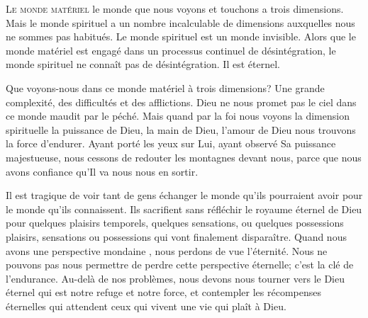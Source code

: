


\lettrine{L}{e monde matériel}
 \ocadr le monde que nous voyons et touchons \fcadr{} a trois dimensions.
 Mais le monde spirituel a un nombre incalculable de dimensions auxquelles
 nous ne sommes pas habitués. Le monde spirituel est un monde invisible.
 Alors que le monde matériel est engagé dans un processus
 continuel de désintégration, le monde spirituel ne connaît pas
 de désintégration. Il est éternel.


Que voyons-nous dans ce monde matériel à trois dimensions?
 Une grande complexité, des difficultés et des afflictions.
 Dieu ne nous promet pas le ciel dans ce monde maudit par le péché.
 Mais quand par la foi nous voyons la dimension spirituelle
 \ocadr la puissance de Dieu, la main de Dieu, l'amour de Dieu \fcadr{}
 nous trouvons la force d'endurer. Ayant porté les yeux sur Lui,
 ayant observé Sa puissance majestueuse, nous cessons de redouter
 les montagnes devant nous, parce que nous avons confiance
 qu'Il va nous nous en sortir.

Il est tragique de voir tant de gens échanger le monde
 qu'ils pourraient 
 avoir pour le monde qu'ils connaissent.
 Ils sacrifient sans réfléchir le royaume éternel de Dieu
 pour quelques plaisirs temporels, quelques sensations, ou quelques possessions
 \ocadr plaisirs, sensations ou possessions qui vont finalement disparaître.
 Quand nous avons une perspective mondaine ,
 nous perdons de vue l'éternité. Nous ne pouvons pas nous permettre de perdre
 cette perspective éternelle; c'est la clé de l'endurance.
 Au-delà de nos problèmes, nous devons nous tourner vers le Dieu éternel
 qui est notre refuge et notre force, et contempler les récompenses
 éternelles qui attendent ceux qui vivent une vie qui plaît à Dieu.

\dvrule



